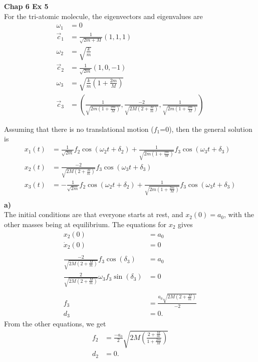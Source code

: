 \documentclass[10pt]{article}
\begin{document}
\textbf{Chap 6 Ex 5}\\
For the tri-atomic molecule, the eigenvectors and eigenvalues are
\begin{align*}
  \omega_1&=0\\
  \vec{c}_1 &= \frac{1}{\sqrt{2m+M}}(1,1,1)\\
  \omega_2&=\sqrt{\frac{k}{m}}\\
  \vec{c}_2 &= \frac{1}{\sqrt{2m}}(1,0,-1)\\
  \omega_3&=\sqrt{\frac{k}{m}\left( 1+\frac{2m}{M} \right)}\\
  \vec{c}_3 &= \left( \frac{1}{\sqrt{2m\left( 1+\frac{2m}{M} \right)}}, \frac{-2}{\sqrt{2M\left( 2+\frac{M}{m} \right)}}, \frac{1}{\sqrt{2m\left( 1+\frac{2m}{M} \right)}}\right)
\end{align*}

Assuming that there is no translational motion ($f_1$=0), then the general solution is
\begin{align*}
  x_1(t) &= \frac{1}{\sqrt{2m}}f_2\cos(\omega_2t+\delta_2) + \frac{1}{\sqrt{2m\left( 1+\frac{2m}{M} \right)}}f_3\cos(\omega_3t+\delta_3)\\
  x_2(t) &= \frac{-2}{\sqrt{2M\left( 2+\frac{M}{m} \right)}} f_3\cos(\omega_3t+\delta_3)\\
  x_3(t) &= -\frac{1}{\sqrt{2m}}f_2\cos(\omega_2t+\delta_2) + \frac{1}{\sqrt{2m\left( 1+\frac{2m}{M} \right)}}f_3\cos(\omega_3t+\delta_3)\\
\end{align*}
\textbf{a)}\\
The initial conditions are that everyone starts at rest, and $x_2(0)=a_0$, 
with the other masses being at equilibrium.  The equations for $x_2$ gives
\begin{align*}
  x_2(0) &= a_0\\
  \dot x_2(0) &= 0\\
  \\
  \frac{-2}{\sqrt{2M\left( 2+\frac{M}{m} \right)}} f_3\cos(\delta_3) &= a_0\\
  \frac{2}{\sqrt{2M\left( 2+\frac{M}{m} \right)}} \omega_3 f_3\sin(\delta_3) &= 0\\
  \\
  f_3 &= \frac{a_0\sqrt{2M\left( 2+\frac{M}{m} \right)}}{-2}\\
  d_3 &= 0.
\end{align*}
From the other equations, we get
\begin{align*}
  f_2 &= \frac{-a_0}{2}\sqrt{2M\left( \frac{2+\frac{M}{m}}{1+\frac{2m}{M}} \right)}\\
  d_2 &= 0.
\end{align*}
\end{document}

